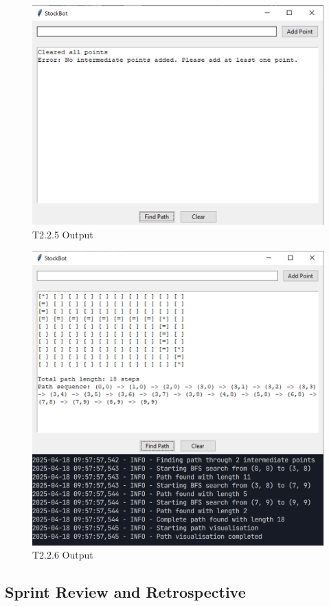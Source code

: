 \begin{figure}[htbp!]
	\centering
	\includegraphics[width=0.45\linewidth]{Images/t2.2.x1.png}
	\caption{T2.2.5 Output}
	\label{fig:enter-label}
\end{figure}

\begin{figure}[htbp!]
	\centering
	\includegraphics[width=0.45\linewidth]{Images/t2.2.6.png}
	\caption{T2.2.6 Output}
	\label{fig:enter-label}
\end{figure}

\newpage %

\clearpage
\subsection{Sprint Review and Retrospective}

